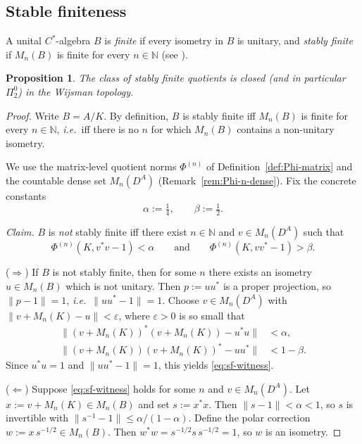 \documentclass[12pt,fleqn,a4paper]{amsart}
\renewcommand{\le}{\leqslant}
\numberwithin{equation}{section}
\newtheorem{proposition}[theorem]{Proposition}
\theoremstyle{definition}
\newcommand{\N}{\mathbb{N}}
\begin{document}
\subsection{Stable finiteness}

A unital $C^*$-algebra $B$ is \emph{finite} if every isometry in $B$ is unitary, and
\emph{stably finite} if $M_n(B)$ is finite for every $n\in\N$
(see \cite[V.2.1.1]{BlackadarOA}).

\begin{proposition}\label{prop:stably-finite}
The class of stably finite quotients is closed (and in particular $\Pi^0_2$)
in the Wijsman topology.
\end{proposition}

\begin{proof}
Write $B=A/K$.
By definition, $B$ is stably finite iff $M_n(B)$ is finite for every $n\in\N$, \emph{i.e.}\
iff there is no $n$ for which $M_n(B)$ contains a non-unitary isometry.

We use the matrix-level quotient norms $\Phi^{(n)}$ of
Definition~\ref{def:Phi-matrix} and the countable dense set $M_n(D^A)$
(Remark~\ref{rem:Phi-n-dense}).
Fix the concrete constants
\[
\alpha:=\tfrac14,\qquad \beta:=\tfrac12.
\]

\smallskip\noindent
\emph{Claim.} $B$ is \emph{not} stably finite iff there exist $n\in\N$ and
$v\in M_n(D^A)$ such that
\begin{equation}\label{eq:sf-witness}
\Phi^{(n)}(K,v^*v-1)<\alpha
\qquad\text{and}\qquad
\Phi^{(n)}(K,vv^*-1)>\beta.
\end{equation}

\smallskip\noindent
($\Rightarrow$) If $B$ is not stably finite, then for some $n$ there exists an
isometry $u\in M_n(B)$ which is not unitary. Then $p:=uu^*$ is a proper projection,
so $\|p-1\|=1$, \emph{i.e.}\ $\|uu^*-1\|=1$.
Choose $v\in M_n(D^A)$ with $\|v+M_n(K)-u\|<\varepsilon$, where $\varepsilon>0$ is so
small that
\begin{align*}
\|(v+M_n(K))^*(v+M_n(K)) - u^*u\|&<\alpha,\\
\|(v+M_n(K))(v+M_n(K))^* - uu^*\|&<1-\beta.
\end{align*}
Since $u^*u=1$ and $\|uu^*-1\|=1$, this yields \eqref{eq:sf-witness}.

\smallskip\noindent
($\Leftarrow$) Suppose \eqref{eq:sf-witness} holds for some $n$ and $v\in M_n(D^A)$.
Let $x:=v+M_n(K)\in M_n(B)$ and set $s:=x^*x$.
Then $\|s-1\|<\alpha<1$, so $s$ is invertible with
$\|s^{-1}-1\|\le \alpha/(1-\alpha)$.
Define the polar correction $w:=x\,s^{-1/2}\in M_n(B)$.
Then $w^*w=s^{-1/2}s\,s^{-1/2}=1$, so $w$ is an isometry.


\end{proof}
\end{document}
